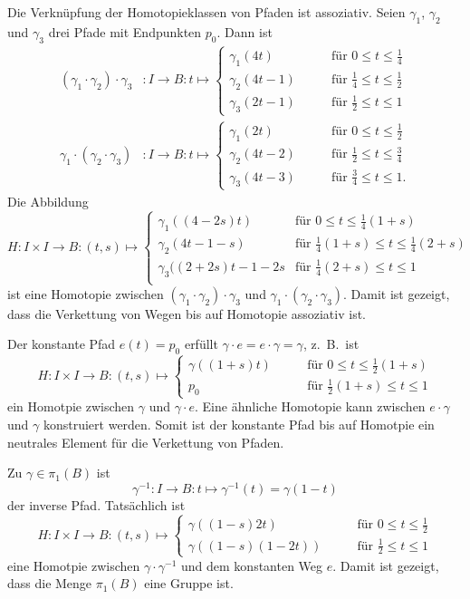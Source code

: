 Die Verknüpfung der Homotopieklassen von Pfaden ist assoziativ.
Seien $\gamma_1$, $\gamma_2$ und $\gamma_3$ drei Pfade mit Endpunkten
$p_0$.
Dann ist
\begin{align*}
(\gamma_1\cdot\gamma_2)\cdot\gamma_3
&\colon
I
\to
B
:
t
\mapsto
\begin{cases}
\gamma_1(4t)&\qquad\text{für $0\le t\le \frac14$}\\
\gamma_2(4t-1)&\qquad\text{für $\frac14\le t\le \frac12$}\\
\gamma_3(2t-1)&\qquad\text{für $\frac12\le t\le 1$}
\end{cases}
\\
\gamma_1\cdot(\gamma_2\cdot\gamma_3)
&\colon
I
\to
B
:
t
\mapsto
\begin{cases}
\gamma_1(2t)&\qquad\text{für $0\le t\le \frac12$}\\
\gamma_2(4t-2)&\qquad\text{für $\frac12\le t\le \frac34$}\\
\gamma_3(4t-3)&\qquad\text{für $\frac34\le t\le 1$.}
\end{cases}
\end{align*}
Die Abbildung
\[
H\colon I\times I \to B
:
(t,s)
\mapsto
\begin{cases}
\gamma_1((4-2s)t)     &\text{für $0\le t\le \frac14(1+s)$}\\
\gamma_2(4t-1-s)      &\text{für $\frac14(1+s) \le t \le \frac14(2+s) $}\\
\gamma_3((2+2s)t-1-2s &\text{für $\frac14(2+s) \le t \le 1$}\\
\end{cases}
\]
ist eine Homotopie zwischen 
$(\gamma_1\cdot\gamma_2)\cdot\gamma_3$
und
$\gamma_1\cdot(\gamma_2\cdot\gamma_3)$.
Damit ist gezeigt, dass die Verkettung von Wegen bis auf Homotopie
assoziativ ist.

Der konstante Pfad $e(t) = p_0$ erfüllt
$\gamma\cdot e=e\cdot \gamma = \gamma$, z.~B.~ist 
\[
H
\colon
I\times I \to B
:
(t,s)
\mapsto
\begin{cases}
\gamma((1+s)t) &\qquad\text{für $0\le t \le \frac12(1+s)$}\\
p_0            &\qquad\text{für $\frac12(1+s)\le t\le 1$}
\end{cases}
\]
ein Homotpie zwischen $\gamma$ und $\gamma\cdot e$.
Eine ähnliche Homotopie kann zwischen $e\cdot\gamma$
und $\gamma$ konstruiert werden.
Somit ist der konstante Pfad bis auf Homotpie ein neutrales Element 
für die Verkettung von Pfaden.

Zu $\gamma\in \pi_1(B)$ ist
\[
\gamma^{-1}
\colon
I\to B
:
t\mapsto \gamma^{-1}(t) = \gamma(1-t)
\]
der inverse Pfad.
Tatsächlich ist
\[
H
\colon
I\times I
\to
B
:
(t,s)
\mapsto
\begin{cases}
\gamma((1-s)2t)    &\qquad\text{für $0\le t\le \frac12$}\\
\gamma((1-s)(1-2t))&\qquad\text{für $\frac12\le t\le 1$}
\end{cases}
\]
eine Homotpie zwischen $\gamma\cdot\gamma^{-1}$ und dem konstanten
Weg $e$.
Damit ist gezeigt, dass die Menge $\pi_1(B)$ eine Gruppe ist.

